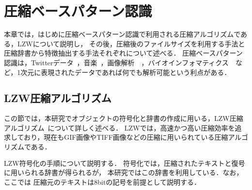 \chapter{圧縮ベースパターン認識}

本章では，はじめに圧縮ベースパターン認識で利用される圧縮アルゴリズムである，LZWについて説明し，
その後，圧縮後のファイルサイズを利用する手法と圧縮辞書から特徴抽出する手法それぞれについて述べる．
圧縮ベースパターン認識は，Twitterデータ~\cite{Nishida:2011:TCD:2064448.2064473}，音楽~\cite{Wolf04algorithmicclustering}，画像解析~\cite{Li2006}~\cite{e15010407}，バイオインフォマティクス~\cite{li2001information}~\cite{1405274}など，1次元に表現されたデータであれば何でも解析可能という利点がある．

\section{LZW圧縮アルゴリズム}
この節では，本研究でオブジェクトの符号化と辞書の作成に用いる，LZW圧縮アルゴリズム~\cite{Welch:1984:THD:1319729.1320134}について詳しく述べる．
LZWでは，高速かつ高い圧縮効率を追求しており，現在もGIF画像やTIFF画像などの圧縮に用いられている圧縮アルゴリズムである．

LZW符号化の手順について説明する．
符号化では，圧縮されたテキストと復号に用いられる辞書が得られるが，
本研究ではこの辞書を利用している．なお，ここでは
圧縮元のテキストは8bitの記号を前提として説明する．

\begin{table}[tb]%
\caption{初期状態のLZW辞書．}
\label{lz}
\begin{center}
\end{center}
\end{table}

